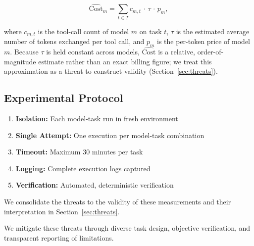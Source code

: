 \begin{equation}
\widehat{\mathrm{Cost}}_m = \sum_{t \in T} c_{m,t}\, \cdot\, \tau \,\cdot\, p_m,
\label{eq:cost}
\end{equation}

\noindent where $c_{m,t}$ is the tool-call count of model $m$ on task $t$, $\tau$ is the estimated average number of tokens exchanged per tool call, and $p_m$ is the per-token price of model $m$. Because $\tau$ is held constant across models, $\widehat{\mathrm{Cost}}$ is a relative, order-of-magnitude estimate rather than an exact billing figure; we treat this approximation as a threat to construct validity (Section~\ref{sec:threats}).

\subsection{Experimental Protocol}
\label{sec:protocol}

\begin{enumerate}
    \item \textbf{Isolation:} Each model-task run in fresh environment
    \item \textbf{Single Attempt:} One execution per model-task combination
    \item \textbf{Timeout:} Maximum 30 minutes per task
    \item \textbf{Logging:} Complete execution logs captured
    \item \textbf{Verification:} Automated, deterministic verification
\end{enumerate}

\noindent We consolidate the threats to the validity of these measurements and their interpretation in Section~\ref{sec:threats}.

We mitigate these threats through diverse task design, objective verification, and transparent reporting of limitations.
